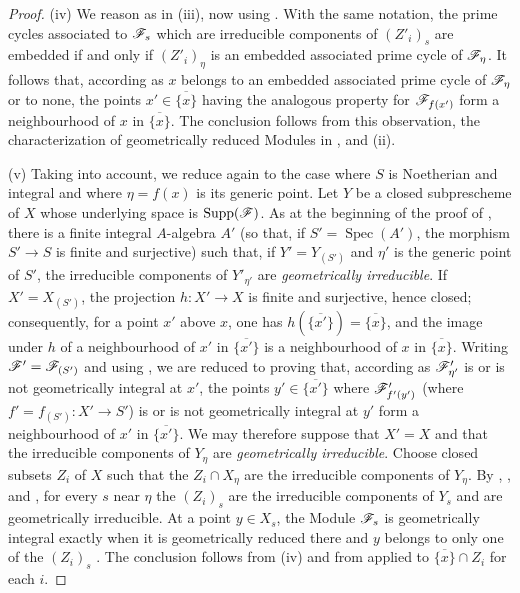 \begin{proof}
(iv) We reason as in (iii), now using .
With the same notation, the prime cycles associated to $\mathscr{F}_s$ which are irreducible components of $(Z'_i)_s$ are embedded if and only if $(Z'_i)_\eta$ is an embedded associated prime cycle of $\mathscr{F}_\eta$.
It follows that, according as $x$ belongs to an embedded associated prime cycle of $\mathscr{F}_\eta$ or to none, the points $x'\in\overline{\{x\}}$ having the analogous property for $\mathscr{F}_{f(x')}$ form a neighbourhood of $x$ in $\overline{\{x\}}$.
The conclusion follows from this observation, the characterization of geometrically reduced Modules in , and (ii).

(v) Taking  into account, we reduce again to the case where $S$ is Noetherian and integral and where $\eta=f(x)$ is its generic point.
Let $Y$ be a closed subprescheme of $X$ whose underlying space is $\operatorname{Supp}(\mathscr{F})$.
As at the beginning of the proof of , there is a finite integral $A$-algebra $A'$ (so that, if $S'=\operatorname{Spec}(A')$, the morphism $S'\to S$ is finite and surjective) such that, if $Y'=Y_{(S')}$ and $\eta'$ is the generic point of $S'$, the irreducible components of $Y'_{\eta'}$ are \emph{geometrically irreducible}.
If $X'=X_{(S')}$, the projection $h:X'\to X$ is finite and surjective, hence closed; consequently, for a point $x'$ above $x$, one has $h(\overline{\{x'\}})=\overline{\{x\}}$, and the image under $h$ of a neighbourhood of $x'$ in $\overline{\{x'\}}$ is a neighbourhood of $x$ in $\overline{\{x\}}$.
Writing $\mathscr{F}'=\mathscr{F}_{(S')}$ and using , we are reduced to proving that, according as $\mathscr{F}'_{\eta'}$ is or is not geometrically integral at $x'$, the points $y'\in\overline{\{x'\}}$ where $\mathscr{F}'_{f'(y')}$ (where $f'=f_{(S')}:X'\to S'$) is or is not geometrically integral at $y'$ form a neighbourhood of $x'$ in $\overline{\{x'\}}$.
We may therefore suppose that $X'=X$ and that the irreducible components of $Y_\eta$ are \emph{geometrically irreducible}.
Choose closed subsets $Z_i$ of $X$ such that the $Z_i\cap X_\eta$ are the
  irreducible components of $Y_\eta$.
By , , and , for every $s$ near $\eta$ the $(Z_i)_s$ are the irreducible components of $Y_s$ and are geometrically irreducible.
At a point $y\in X_s$, the Module $\mathscr{F}_s$ is geometrically integral exactly when it is geometrically reduced there and $y$ belongs to only one of the $(Z_i)_s$ .
The conclusion follows from (iv) and from  applied to $\overline{\{x\}}\cap Z_i$ for each $i$.


\end{proof}
